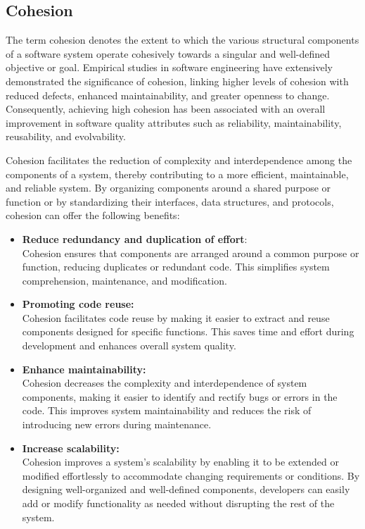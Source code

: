\subsection{Cohesion} \label{subsubsec:on_cohesion}

The term cohesion denotes the extent to which the various structural components of a
software system operate cohesively towards a singular and well-defined objective or goal.
Empirical studies in software engineering have extensively demonstrated the significance
of cohesion, linking higher levels of cohesion with reduced defects, enhanced
maintainability, and greater openness to change. Consequently, achieving high cohesion has
been associated with an overall improvement in software quality attributes such as
reliability, maintainability, reusability, and evolvability.

Cohesion facilitates the reduction of complexity and interdependence among the components
of a system, thereby contributing to a more efficient, maintainable, and reliable system.
By organizing components around a shared purpose or function or by standardizing their
interfaces, data structures, and protocols, cohesion can offer the following benefits:

\begin{itemize}
    \item \textbf{Reduce redundancy and duplication of effort}: \\
    Cohesion ensures that components are arranged around a common purpose or function,
    reducing duplicates or redundant code. This simplifies system comprehension,
    maintenance, and modification.
    \item \textbf{Promoting code reuse:}\\
    Cohesion facilitates code reuse by making it easier to extract and reuse components
    designed for specific functions. This saves time and effort during development and
    enhances overall system quality.
    \item \textbf{Enhance maintainability:}\\
    Cohesion decreases the complexity and interdependence of system components, making it
    easier to identify and rectify bugs or errors in the code. This improves system
    maintainability and reduces the risk of introducing new errors during maintenance.
    \item \textbf{Increase scalability:}\\
    Cohesion improves a system's scalability by enabling it to be extended or modified
    effortlessly to accommodate changing requirements or conditions. By designing
    well-organized and well-defined components, developers can easily add or modify
    functionality as needed without disrupting the rest of the system.  
\end{itemize}

